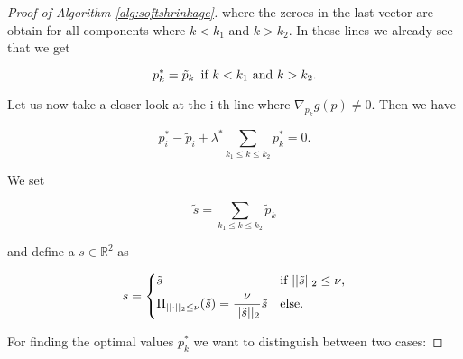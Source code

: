 \begin{proof}[Proof of Algorithm \ref{alg:softshrinkage}]
        where the zeroes in the last vector are obtain for all components where $k < k_{1}$ and $k > k_{2}$. In these lines we already see that we get

            $$p^{\ast}_{k} = \tilde{p}_{k} \,\,\, \textnormal{if} \,\, k < k_{1} \,\, \textnormal{and} \,\, k > k_{2}.$$

        Let us now take a closer look at the i-th line where $\nabla_{p_{k}} g(p) \ne 0$. Then we have

            \begin{equation}
                p^{\ast}_{i} - \tilde{p}_{i} + \lambda^{\ast} \sum_{k_{1} \le k \le k_{2}} p^{\ast}_{k} = 0. \label{eq:ithRow}
            \end{equation}

        We set %



            $$\tilde{s} = \sum\limits_{k_{1} \le k \le k_{2}} \tilde{p}_{k}$$

        and define a $s \in \mathbb{R}^{2}$ as

            \[
                s =
                    \begin{dcases*}
                        \tilde{s} & \textnormal{if $||\tilde{s}||_{2} \le \nu$},\\
                        \Pi_{||\cdot||_{2} \le \nu}(\tilde{s}) = \frac{\nu}{||\tilde{s}||_{2}} \tilde{s} & \textnormal{else}.
                    \end{dcases*}
            \]

        \newpage

        For finding the optimal values $p^{\ast}_{k}$ we want to distinguish between two cases:


\end{proof}
